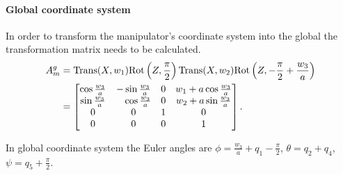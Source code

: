 \paragraph{Global coordinate system}
In order to transform the manipulator's coordinate system into the global the transformation matrix needs to be calculated.
\begin{equation}
\begin{aligned}
A_m^g&=\mathrm{Trans}(X, w_1)\mathrm{Rot}\left(Z, \frac{\pi}{2}\right)\mathrm{Trans}(X, w_2)\mathrm{Rot}\left(Z, -\frac{\pi}{2}+\frac{w_3}{a}\right)\\
&= \begin{bmatrix}
\cos \frac{w_3}{a} & -\sin \frac{w_3}{a} & 0 & w_1+a\cos \frac{w_3}{a}\\
\sin \frac{w_3}{a} & \phantom{-}\cos \frac{w_3}{a} & 0 & w_2+a\sin \frac{w_3}{a}\\
0 & 0 & 1 & 0\\
0 & 0 & 0 & 1
\end{bmatrix}.
\end{aligned}
\end{equation}

In global coordinate system the Euler angles are $\phi=\frac{w_3}{a}+q_1-\frac{\pi}{2}$, $\theta=q_2+q_4$, $\psi=q_5+\frac{\pi}{2}$.
